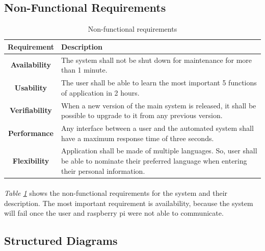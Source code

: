 \documentclass[12pt, oneside, a4paper]{book}
\newcommand\boldcolor[1]{\textcolor{bold}{\textbf{#1}}}
\begin{document}
			\newpage\subsection{Non-Functional Requirements}
				\def\arraystretch{1.5}
				\begin{table}[H]
					\begin{center}
						\begin{tabularx}{\linewidth}{|c|X|}\hline
							\boldcolor{Requirement} & \boldcolor{Description}\\\hline
							\textbf{Availability} & The system shall not be shut down for maintenance for more than 1 minute. \\\hline
							\textbf{Usability} & The user shall be able to learn the most important 5 functions of application in 2 hours.  \\\hline
							\textbf{Verifiability} & When a new version of the main system is released, it shall be possible to upgrade to it from any previous version. \\\hline
							\textbf{Performance} & Any interface between a user and the automated system shall have a maximum response time of three seconds. \\\hline
							\textbf{Flexibility} & Application shall be made of multiple languages. So, user shall be able to nominate their preferred language when entering their personal information. \\\hline
						\end{tabularx}
					\end{center}
					\caption{Non-functional requirements}
					\label{table:non-func}
				\end{table}
			\paragraph{} \textit{Table \ref{table:non-func}} shows the non-functional requirements for the system and their description. The most important requirement is availability, because the system will fail once the user and raspberry pi were not able to communicate. %
			\newpage\subsection{Structured Diagrams}
\end{document}
